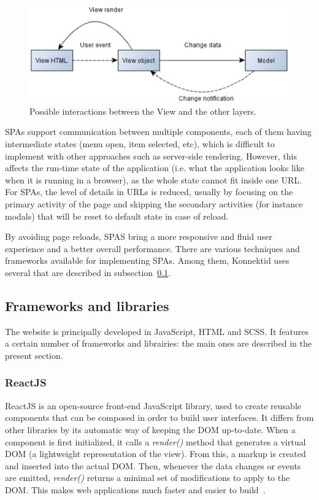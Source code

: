 \begin{figure}[H]
    \centering
    \includegraphics[scale=0.6]{figure/view.png}
    \caption{Possible interactions between the View and the other layers.}
    \label{fig:view}
\end{figure}

SPAs support communication between multiple components, each of them having intermediate states (menu open, item selected, etc), which is difficult to
implement with other approaches such as server-side rendering. However, this affects the run-time state of the application (i.e. what the application looks like when it is
running in a browser), as the whole state cannot fit inside one URL. For SPAs, the level of details in URLs is reduced, usually by focusing on the primary activity
of the page and skipping the secondary activities (for instance modals) that will be reset to default state in case of reload.

By avoiding page reloads, SPAS bring a more responsive and fluid user experience and a better overall performance.
There are various techniques and frameworks available for implementing SPAs.
Among them, Konnektid uses several that are described in {\sc subsection}~\ref{ssec:frameworks}.

\subsection{Frameworks and libraries}
\label{ssec:frameworks}

The website is principally developed in JavaScript, HTML and SCSS. It features a certain number of frameworks and librairies: the main ones are described in the present section.

\subsubsection{ReactJS}
\label{sssec:react}

ReactJS is an open-source front-end JavaScript library, used to create reusable components that can be composed in order to build user interfaces. It differs from other libraries by its automatic way of keeping the DOM up-to-date.
When a component is first initialized, it calls a \textit{render()} method that generates a \guillemotleft{} virtual DOM \guillemotright{} (a lightweight representation of the view). From this, a markup is created and inserted into the actual DOM.
Then, whenever the data changes or events are emitted, \textit{render()} returns a minimal set of modifications to apply to the DOM.
This makes web applications much faster and easier to build~\cite{whyReact}.

